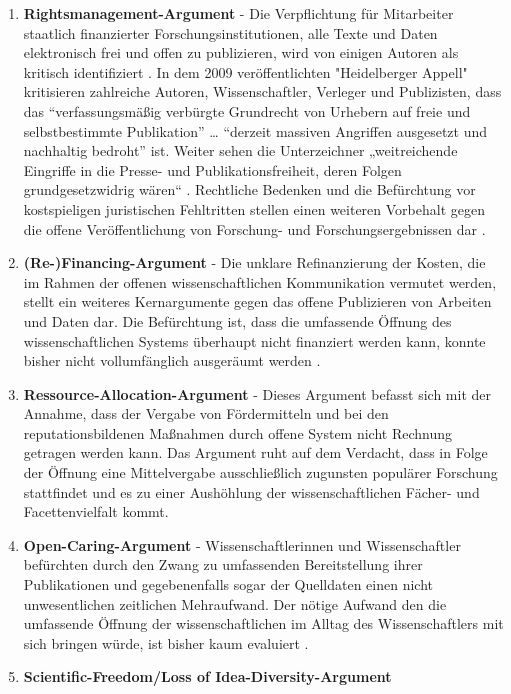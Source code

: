 \begin{enumerate}
\item \textbf{Rightsmanagement-Argument} - Die Verpflichtung für Mitarbeiter staatlich finanzierter Forschungsinstitutionen, alle Texte und Daten elektronisch frei und offen zu publizieren, wird von einigen Autoren als kritisch identifiziert \cite{suchen}. In dem 2009 veröffentlichten "Heidelberger Appell" \cite{faz_heidelberger_apell_2009} kritisieren zahlreiche Autoren, Wissenschaftler, Verleger und Publizisten, dass das “verfassungsmäßig verbürgte Grundrecht von Urhebern auf freie und selbstbestimmte Publikation” … “derzeit massiven Angriffen ausgesetzt und nachhaltig bedroht” ist. Weiter sehen die Unterzeichner „weitreichende Eingriffe in die Presse- und Publikationsfreiheit, deren Folgen grundgesetzwidrig wären“ \cite{ITK_2009}. Rechtliche Bedenken und die Befürchtung vor kostspieligen juristischen Fehltritten stellen einen weiteren Vorbehalt gegen die offene Veröffentlichung von Forschung- und Forschungsergebnissen dar \cite{weishaupt_2009_goldenOA}.
\item \textbf{(Re-)Financing-Argument} - Die unklare Refinanzierung der Kosten, die im Rahmen der offenen wissenschaftlichen Kommunikation vermutet werden, stellt ein weiteres Kernargumente gegen das offene Publizieren von Arbeiten und Daten dar. Die Befürchtung ist, dass die umfassende Öffnung des wissenschaftlichen Systems überhaupt nicht finanziert werden kann, konnte bisher nicht vollumfänglich ausgeräumt werden \cite{weishaupt_2009_goldenOA}.
\item \textbf{Ressource-Allocation-Argument} - Dieses Argument befasst sich mit der Annahme, dass der Vergabe von Fördermitteln und bei den reputationsbildenen Maßnahmen durch offene System nicht Rechnung getragen werden kann. Das Argument ruht auf dem Verdacht, dass in Folge der Öffnung eine Mittelvergabe ausschließlich zugunsten populärer Forschung stattfindet und es zu einer Aushöhlung der wissenschaftlichen Fächer- und Facettenvielfalt kommt.
\item \textbf{Open-Caring-Argument} - Wissenschaftlerinnen und Wissenschaftler befürchten durch den Zwang zu umfassenden Bereitstellung ihrer Publikationen und gegebenenfalls sogar der Quelldaten einen nicht unwesentlichen zeitlichen Mehraufwand. Der nötige Aufwand den die umfassende Öffnung der wissenschaftlichen im Alltag des Wissenschaftlers mit sich bringen würde, ist bisher kaum evaluiert \cite{osterloh2008anreize}.
\item \textbf{Scientific-Freedom/Loss of Idea-Diversity-Argument}

\end{enumerate}
